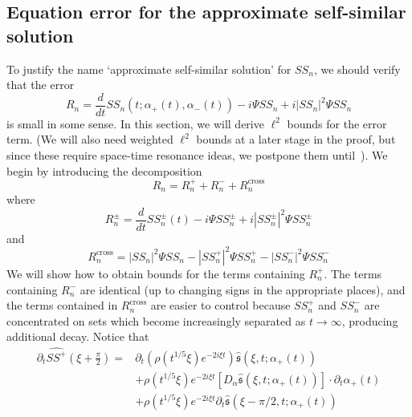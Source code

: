\documentclass[letterpaper, reqno,final]{amsart}
\newcommand{\fs}{\mathfrak{s}}
\newcommand{\fhPi}{\frac{\pi}{2}}
\newcommand{\mSS}{\mathit{SS}}
\newcommand{\discrAvg}{\Psi}
\begin{document}
\subsection{Equation error for the approximate self-similar solution\label{sec:ss-eqn-error}}

To justify the name `approximate self-similar solution' for $\mSS_n$, we should verify that the error
\begin{equation}\label{eqn:R-n-def}
    R_n = \frac{d}{dt} \mSS_n(t; \alpha_+(t), \alpha_-(t)) -i\discrAvg \mSS_n + i|\mSS_n|^2 \discrAvg \mSS_{n}
\end{equation}
is small in some sense.  In this section, we will derive $\ell^2$ bounds for the error term.  (We will also need weighted $\ell^2$ bounds at a later stage in the proof, but since these require space-time resonance ideas, we postpone them until~).  We begin by introducing the decomposition
\begin{equation*}
    R_n = R_n^+ + R_n^- + R_n^{\text{cross}}
\end{equation*}
where
\begin{equation}\label{eqn:R-n-pm-def}
    R_n^\pm = \frac{d}{dt} \mSS_n^\pm(t) - i \Psi \mSS_n^\pm + i |\mSS_n^\pm|^2 \Psi \mSS_n^\pm
\end{equation}
and
\begin{equation}\label{eqn:R-n-cross-def}
    R_n^{\text{cross}} = |\mSS_n|^2\Psi \mSS_n - |\mSS_n^+|^2\Psi \mSS_n^+ - |\mSS_n^-|^2\Psi \mSS_n^-
\end{equation}
We will show how to obtain bounds for the terms containing $R_n^+$.  The terms containing $R_n^-$ are identical (up to changing signs in the appropriate places), and the terms contained in $R_n^\text{cross}$ are easier to control because $\mSS_n^+$ and $\mSS_n^-$ are concentrated on sets which become increasingly separated as $t \to \infty$, producing additional decay.  Notice that
\begin{equation*}\begin{split}
    \partial_t \hat{\mSS^+}(\xi + \fhPi) =& \partial_t\left(\rho(t^{1/5}\xi)e^{-2i\xi t}\right)\hat{\fs}(\xi, t; \alpha_+(t))\\
    &+\rho(t^{1/5}\xi)e^{-2i\xi t}[D_\alpha\hat{\fs}(\xi, t; \alpha_+(t))]\cdot \partial_t \alpha_+(t)\\
    &+\rho(t^{1/5}\xi)e^{-2i\xi t}\partial_t\hat{\fs}(\xi - \pi/2, t; \alpha_+(t))\\
\end{split}\end{equation*}
\end{document}
